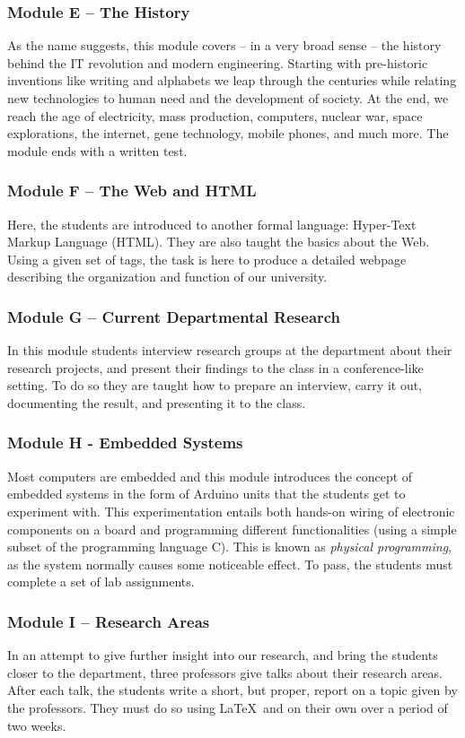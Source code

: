 \documentclass[conference]{IEEEtran}
\begin{document}
\subsubsection{Module E – The History} As the name suggests, this module covers -- in a very broad sense -- the history behind the IT revolution and modern engineering. Starting with pre-historic inventions like writing and alphabets we leap through the centuries while relating new technologies to human need and the development of society. At the end, we reach the age of electricity, mass production, computers, nuclear war, space explorations, the internet, gene technology, mobile phones, and much more. The module ends with a written test. 

\subsubsection{Module F – The Web and HTML} Here, the students are introduced to another formal language: Hyper-Text Markup Language (HTML). They are also taught the basics about the Web. Using a given set of tags, the task is here to produce a detailed webpage describing the organization and function of our university. 

\subsubsection{Module G – Current Departmental Research} In this module students interview research groups at the department about their research projects, and present their findings to the class in a conference-like setting. To do so they are taught how to prepare an interview, carry it out, documenting the result, and presenting it to the class. 

\subsubsection{Module H - Embedded Systems} Most computers are embedded and this module introduces the concept of embedded systems in the form of Arduino units that the students get to experiment with. This experimentation entails both hands-on wiring of electronic components on a board and programming different functionalities  (using a simple subset of the programming language C). This is known as \emph{physical programming}, as the system normally causes some noticeable effect. To pass, the students must complete a set of lab assignments. 

\subsubsection{Module I – Research Areas} In an attempt to give further insight into our research, and bring the students closer to the department, three professors give talks about their research areas. After each talk, the students write a short, but proper, report on a topic given by the professors. They must do so using \LaTeX\  and on their own over a period of two weeks. 
\end{document}
